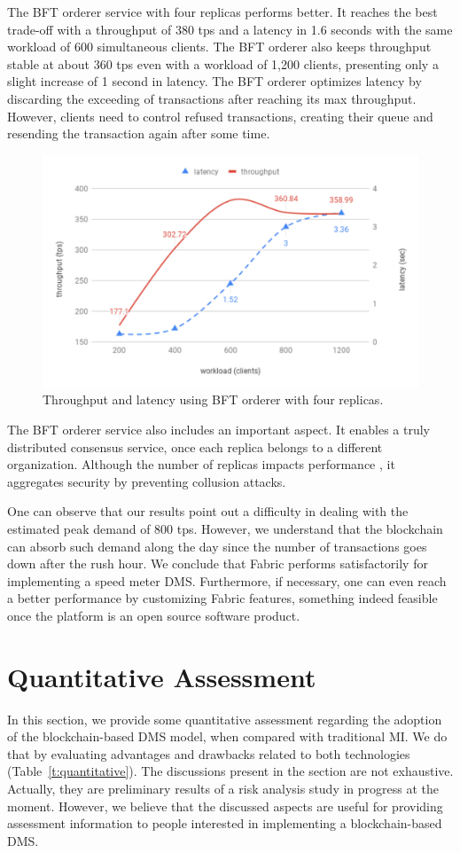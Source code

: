 \documentclass[journal]{IEEEtran}
\begin{document}
The BFT orderer service with four replicas performs better.
It reaches the best trade-off with a throughput of 380 tps and a latency in 1.6 seconds with the same workload of 600 simultaneous clients.
The BFT orderer also keeps throughput stable at about 360 tps even with a workload of 1,200 clients, presenting only a slight increase of 1 second in latency.
The BFT orderer optimizes latency by discarding the exceeding of transactions after reaching its max throughput.
However, clients need to control refused transactions, creating their queue and resending the transaction again after some time.

\begin{figure}[!t]
\centering
\includegraphics[width=.45\textwidth]{chartbft4r} %
\caption{Throughput and latency using BFT orderer with four replicas.}
\label{f:latthbft4}
\end{figure}

The BFT orderer service also includes an important aspect.
It enables a truly distributed consensus service, once each replica belongs to a different organization.
Although the number of replicas impacts performance \cite{Bessani2014}, it aggregates security by preventing collusion attacks.

One can observe that our results point out a difficulty in dealing with the estimated peak demand of 800 tps.
However, we understand that the blockchain can absorb such demand along the day since the number of transactions goes down after the rush hour.
We conclude that Fabric performs satisfactorily for implementing a speed meter DMS.
Furthermore, if necessary, one can even reach a better performance by customizing Fabric features, something indeed feasible once the platform is an open source software product.

\section{Quantitative Assessment}
In this section, we provide some quantitative assessment regarding the adoption of the blockchain-based DMS model, when compared with traditional MI.
We do that by evaluating advantages and drawbacks related to both technologies (Table~\ref{t:quantitative}).
The discussions present in the section are not exhaustive.
Actually, they are preliminary results of a risk analysis study in progress at the moment.
However, we believe that the discussed aspects are useful for providing assessment information to people interested in implementing a blockchain-based DMS.
\end{document}
